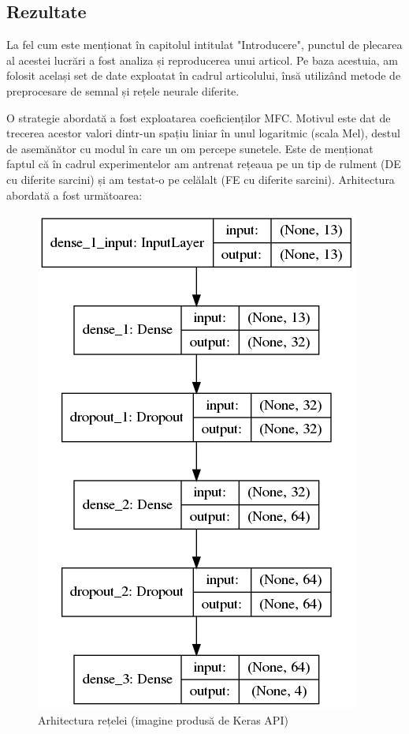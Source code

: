 \documentclass[a4paper,12pt]{report}
\begin{document}
    	\subsection{Rezultate}
    	La fel cum este menționat în capitolul intitulat "Introducere", punctul de plecarea al acestei lucrări a fost analiza și reproducerea unui articol. Pe baza acestuia, am folosit același set de date exploatat în cadrul articolului, însă utilizând metode de preprocesare de semnal și rețele neurale diferite.
    	
    	O strategie abordată a fost exploatarea coeficienților MFC. Motivul este dat de trecerea acestor valori dintr-un spațiu liniar în unul logaritmic (scala Mel), destul de asemănător cu modul în care un om percepe sunetele. Este de menționat faptul că în cadrul experimentelor am antrenat rețeaua pe un tip de rulment (DE cu diferite sarcini) și am testat-o pe celălalt (FE cu diferite sarcini). Arhitectura abordată a fost următoarea:
    	
    	\begin{figure}[H]
    		\begin{center}
    			\includegraphics[scale=0.4]{images/Cm-Architecture.png}
    		\end{center}
    		\caption{Arhitectura rețelei (imagine produsă de Keras API)}
    		\label{fig:cm_arch}
    	\end{figure} 
    	
\end{document}
